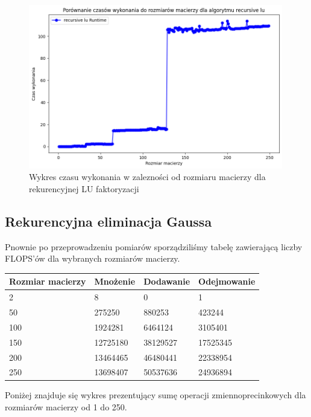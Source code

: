 \documentclass{article}
\begin{document}
\begin{figure}[H]
  \centering
    \includegraphics[width=0.99\textwidth]{lu_time.png}
  \caption{Wykres czasu wykonania w zalezności od rozmiaru macierzy dla rekurencyjnej LU faktoryzacji}
\end{figure}

\subsection{Rekurencyjna eliminacja Gaussa}

Pnownie po przeprowadzeniu pomiarów sporządziliśmy tabelę zawierającą liczby FLOPS'ów dla wybranych rozmiarów macierzy.

\begin{table}[!ht]
    \centering
    \begin{tabular}{|l|l|l|l|}
    \hline
        Rozmiar macierzy & Mnożenie & Dodawanie & Odejmowanie \\ \hline
        2 & 8 & 0 & 1 \\ \hline
        50 & 275250 & 880253 & 423244 \\ \hline
        100 & 1924281 & 6464124 & 3105401 \\ \hline
        150 & 12725180 & 38129527 & 17525345 \\ \hline
        200 & 13464465 & 46480441 & 22338954 \\ \hline
        250 & 13698407 & 50537636 & 24936894 \\ \hline
    \end{tabular}
\end{table}

\noindent
Poniżej znajduje się wykres prezentujący sumę operacji zmiennoprecinkowych
dla rozmiarów macierzy od 1 do 250.
\end{document}
